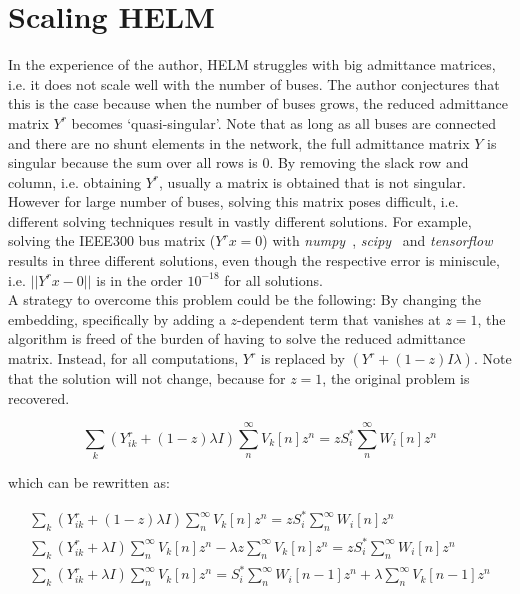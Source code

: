 \documentclass[11pt]{cmuthesis} %
\begin{document}
\section{Scaling HELM}
In the experience of the author, HELM struggles with big admittance matrices, i.e. it does not scale well with the number of buses. The author conjectures that this is the case because when the number of buses grows, the reduced admittance matrix $Y^r$ becomes `quasi-singular'. Note that as long as all buses are connected and there are no shunt elements in the network, the full admittance matrix $Y$ is singular because the sum over all rows is 0. By removing the slack row and column, i.e. obtaining $Y^r$, usually a matrix is obtained that is not singular. However for large number of buses, solving this matrix poses difficult, i.e. different solving techniques result in vastly different solutions. For example, solving the IEEE300 bus matrix ($Y^rx = 0$) with \emph{numpy}~\cite{numpy}, \emph{scipy}~\cite{scipy} and \emph{tensorflow}~\cite{tensorflow2015-whitepaper} results in three different solutions, even though the respective error is miniscule, i.e. $||Y^rx - 0||$ is in the order $10^{-18}$ for all solutions.\\
A strategy to overcome this problem could be the following: By changing the embedding, specifically by adding a $z$-dependent term that vanishes at $z=1$, the algorithm is freed of the burden of having to solve the reduced admittance matrix. Instead, for all computations, $Y^r$ is replaced by $(Y^r + (1-z)I\lambda)$. Note that the solution will not change, because for $z=1$, the original problem is recovered.

\begin{equation}
\sum_k (Y^r_{ik} + (1-z) \lambda I) \sum_n^{\infty} V_k[n]z^n = zS_i^*\sum_n^{\infty} W_i[n]z^n
\end{equation}

which can be rewritten as:

\begin{align}
\sum_k (Y^r_{ik} + (1-z) \lambda I) \sum_n^{\infty} V_k[n]z^n = zS_i^*\sum_n^{\infty} W_i[n]z^n\\
\sum_k (Y^r_{ik} + \lambda I) \sum_n^{\infty} V_k[n]z^n  - \lambda z\sum_n^{\infty} V_k[n]z^n = zS_i^*\sum_n^{\infty} W_i[n]z^n \\
\sum_k (Y^r_{ik} + \lambda I) \sum_n^{\infty} V_k[n]z^n  = S_i^*\sum_n^{\infty} W_i[n - 1]z^n + \lambda\sum_n^{\infty} V_k[n-1]z^n
\end{align}
\end{document}
